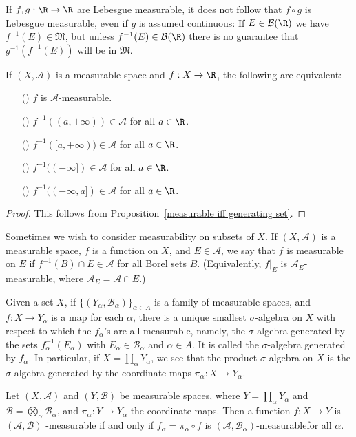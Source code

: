 \begin{remark}
If $f,g:\R\to\R$ are Lebesgue measurable, it does not follow that $f\circ g$ is Lebesgue measurable, even if $g$ is assumed continuous: If $E\in\mathcal{B}(\R)$ we have $f^{-1}(E)\in\mathfrak{M}$, but unless $f^{-1}(E)\in\mathcal{B}(\R)$ there is no guarantee that $g^{-1}(f^{-1}(E))$ will be in $\mathfrak{M}$.
\end{remark}
\begin{proposition}\label{measurable function iff}
If $(X,\mathcal{A})$ is a measurable space and $f:X\to\R$, the following
are equivalent:
\begin{itemize}
\item[(\rmnum{1})] $f$ is $\mathcal{A}$-measurable.
\item[(\rmnum{2})] $f^{-1}((a,+\infty))\in\mathcal{A}$ for all $a\in\R$.
\item[(\rmnum{3})] $f^{-1}([a,+\infty))\in\mathcal{A}$ for all $a\in\R$.
\item[(\rmnum{4})] $f^{-1}((-\infty])\in\mathcal{A}$ for all $a\in\R$.
\item[(\rmnum{5})] $f^{-1}((-\infty,a])\in\mathcal{A}$ for all $a\in\R$. 
\end{itemize}
\end{proposition}
\begin{proof}
This follows from Proposition~\ref{measurable iff generating set}.
\end{proof}
Sometimes we wish to consider measurability on subsets of $X$. If $(X,\mathcal{A})$ is a measurable space, $f$ is a function on $X$, and $E\in\mathcal{A}$, we say that $f$ is measurable on $E$ if $f^{-1}(B)\cap E\in\mathcal{A}$ for all Borel sets $B$. (Equivalently, $f|_E$ is $\mathcal{A}_E$-measurable, where $\mathcal{A}_E=\mathcal{A}\cap E$.)\par
Given a set $X$, if $\{(Y_\alpha,\mathcal{B}_\alpha)\}_{\alpha\in A}$ is a family of measurable spaces, and $f:X\to Y_\alpha$ is a map for each $\alpha$, there is a unique smallest $\sigma$-algebra on $X$ with respect to which the $f_\alpha$'s are all measurable, namely, the $\sigma$-algebra generated by the sets $f_\alpha^{-1}(E_\alpha)$ with $E_\alpha\in\mathcal{B}_\alpha$ and $\alpha\in A$. It is called the $\sigma$-algebra generated by $f_\alpha$. In particular, if $X=\prod_{\alpha}Y_\alpha$, we see that the product $\sigma$-algebra on $X$ is the $\sigma$-algebra generated by the coordinate maps $\pi_\alpha:X\to Y_\alpha$.
\begin{proposition}\label{measurable iff component}
Let $(X,\mathcal{A})$ and $(Y,\mathcal{B})$ be measurable spaces, where $Y=\prod_{\alpha}Y_\alpha$ and $\mathcal{B}=\bigotimes_\alpha\mathcal{B}_\alpha$, and $\pi_\alpha:Y\to Y_\alpha$ the coordinate maps. Then a function $f:X\to Y$ is $(\mathcal{A},\mathcal{B})$ -measurable if and only if $f_\alpha=\pi_\alpha\circ f$ is $(\mathcal{A},\mathcal{B}_\alpha)$-measurablefor all $\alpha$.
\end{proposition}
